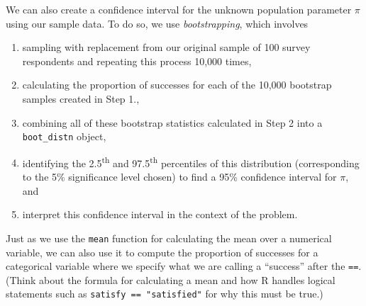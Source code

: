 \documentclass[12pt,]{krantz}
\makeatletter
\newenvironment{Shaded}{\begin{snugshade}}{\end{snugshade}}
\newcommand{\KeywordTok}[1]{\textcolor[rgb]{0.27,0.27,0.27}{\textbf{#1}}}
\newcommand{\DataTypeTok}[1]{\textcolor[rgb]{0.27,0.27,0.27}{#1}}
\newcommand{\DecValTok}[1]{\textcolor[rgb]{0.06,0.06,0.06}{#1}}
\newcommand{\StringTok}[1]{\textcolor[rgb]{0.5,0.5,0.5}{#1}}
\newcommand{\OperatorTok}[1]{\textcolor[rgb]{0.43,0.43,0.43}{\textbf{#1}}}
\newcommand{\NormalTok}[1]{#1}
\providecommand{\tightlist}{%
  \setlength{\itemsep}{0pt}\setlength{\parskip}{0pt}}
\newenvironment{kframe}{%
\medskip{}
\setlength{\fboxsep}{.8em}
 \def\at@end@of@kframe{}%
 \ifinner\ifhmode%
  \def\at@end@of@kframe{\end{minipage}}%
  \begin{minipage}{\columnwidth}%
 \fi\fi%
 \def\FrameCommand##1{\hskip\@totalleftmargin \hskip-\fboxsep
 \colorbox{shadecolor}{##1}\hskip-\fboxsep
     \hskip-\linewidth \hskip-\@totalleftmargin \hskip\columnwidth}%
 \MakeFramed {\advance\hsize-\width
   \@totalleftmargin\z@ \linewidth\hsize
   \@setminipage}}%
 {\par\unskip\endMakeFramed%
 \at@end@of@kframe}
\renewenvironment{Shaded}{\begin{kframe}}{\end{kframe}}
\theoremstyle{definition}
\theoremstyle{definition}
\theoremstyle{definition}
\theoremstyle{remark}
\makeatother
\begin{document}
We can also create a confidence interval for the unknown population
parameter \(\pi\) using our sample data. To do so, we use
\emph{bootstrapping}, which involves

\begin{enumerate}
\def\labelenumi{\arabic{enumi}.}
\tightlist
\item
  sampling with replacement from our original sample of 100 survey
  respondents and repeating this process 10,000 times,
\item
  calculating the proportion of successes for each of the 10,000
  bootstrap samples created in Step 1.,
\item
  combining all of these bootstrap statistics calculated in Step 2 into
  a \texttt{boot\_distn} object,
\item
  identifying the 2.5\textsuperscript{th} and 97.5\textsuperscript{th}
  percentiles of this distribution (corresponding to the 5\%
  significance level chosen) to find a 95\% confidence interval for
  \(\pi\), and
\item
  interpret this confidence interval in the context of the problem.
\end{enumerate}

\begin{Shaded}
\end{Shaded}

Just as we use the \texttt{mean} function for calculating the mean over
a numerical variable, we can also use it to compute the proportion of
successes for a categorical variable where we specify what we are
calling a ``success'' after the \texttt{==}. (Think about the formula
for calculating a mean and how R handles logical statements such as
\texttt{satisfy\ ==\ "satisfied"} for why this must be true.)

\begin{Shaded}
\end{Shaded}
\end{document}
